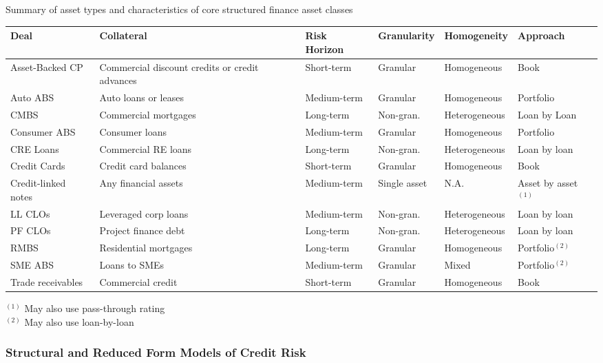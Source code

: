 \begin{flushleft}
Summary of asset types and characteristics of core structured finance asset classes
\begin{tabularx}{\textwidth}{p{8.4em}|p{11em}|p{6em}|p{5em}|p{6em}|p{7.5em}}
\hline
\rowcolor{gray!30}
Deal & Collateral & Risk Horizon & Granularity & Homogeneity & Approach \\
\hline
Asset-Backed CP & Commercial discount credits or credit advances & Short-term & Granular & Homogeneous & Book \\
\hline
Auto ABS & Auto loans or leases & Medium-term & Granular & Homogeneous & Portfolio \\
\hline
CMBS & Commercial mortgages & Long-term & Non-gran. & Heterogeneous & Loan by Loan \\
\hline
Consumer ABS & Consumer loans & Medium-term & Granular & Homogeneous & Portfolio \\
\hline
CRE Loans & Commercial RE loans & Long-term & Non-gran. & Heterogeneous & Loan by loan \\
\hline
Credit Cards & Credit card balances & Short-term & Granular & Homogeneous & Book \\
\hline
Credit-linked notes & Any financial assets & Medium-term & Single asset & N.A. & Asset by asset$^{(1)}$ \\
\hline
LL CLOs & Leveraged corp loans & Medium-term & Non-gran. & Heterogeneous & Loan by loan \\
\hline
PF CLOs & Project finance debt & Long-term & Non-gran. & Heterogeneous & Loan by loan \\
\hline
RMBS & Residential mortgages & Long-term & Granular & Homogeneous & Portfolio$^{(2)}$ \\
\hline
SME ABS & Loans to SMEs & Medium-term & Granular & Mixed & Portfolio$^{(2)}$ \\
\hline
Trade receivables & Commercial credit & Short-term & Granular & Homogeneous & Book \\
\hline
\end{tabularx}
$^{(1)}$ May also use pass-through rating\\
$^{(2)}$ May also use loan-by-loan
\end{flushleft}

\subsubsection{Structural and Reduced Form Models of Credit Risk}

